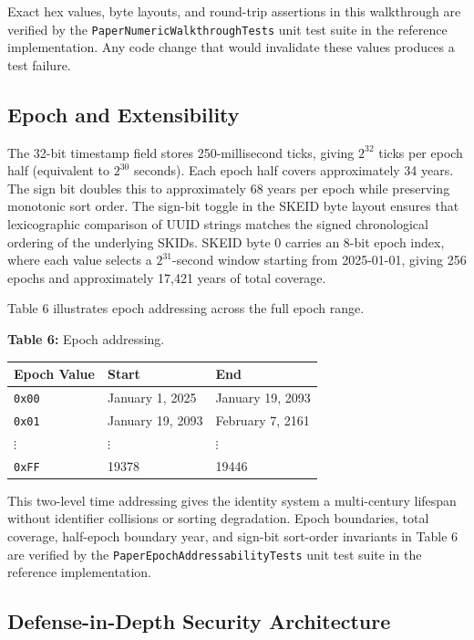 \documentclass[fleqn,10pt]{wlpeerj}
\newcounter{none} %
\begin{document}
Exact hex values, byte layouts, and round-trip assertions in this
walkthrough are verified by the \texttt{PaperNumericWalkthroughTests}
unit test suite in the reference implementation. Any code change that
would invalidate these values produces a test failure.

\subsection{Epoch and Extensibility}\label{epoch-and-extensibility}

The 32-bit timestamp field stores 250-millisecond ticks, giving
\(2^{32}\) ticks per epoch half (equivalent to \(2^{30}\) seconds). Each
epoch half covers approximately 34 years. The sign bit doubles this to
approximately 68 years per epoch while preserving monotonic sort order.
The sign-bit toggle in the SKEID byte layout ensures that lexicographic
comparison of UUID strings matches the signed chronological ordering of
the underlying SKIDs. SKEID byte 0 carries an 8-bit epoch index, where
each value selects a \(2^{31}\)-second window starting from 2025-01-01,
giving 256 epochs and approximately 17,421 years of total coverage.

\newpage

Table 6 illustrates epoch addressing across the full epoch range.

\textbf{Table 6:} Epoch addressing.

{\def\LTcaptype{none} %
\begin{longtable}[]{@{}lll@{}}
\toprule\noalign{}
Epoch Value & Start & End \\
\midrule\noalign{}
\endhead
\bottomrule\noalign{}
\endlastfoot
\texttt{0x00} & January 1, 2025 & January 19, 2093 \\
\texttt{0x01} & January 19, 2093 & February 7, 2161 \\
\(\vdots\) & \(\vdots\) & \(\vdots\) \\
\texttt{0xFF} & 19378 & 19446 \\
\end{longtable}
}

This two-level time addressing gives the identity system a multi-century
lifespan without identifier collisions or sorting degradation. Epoch
boundaries, total coverage, half-epoch boundary year, and sign-bit
sort-order invariants in Table 6 are verified by the
\texttt{PaperEpochAddressabilityTests} unit test suite in the reference
implementation.

\subsection{Defense-in-Depth Security
Architecture}\label{defense-in-depth-security-architecture}
\end{document}
